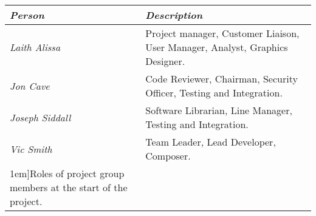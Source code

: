 \begin{table*}[h!]
	\begin{tabular}{l p{38em}}
		\toprule
		\emph{Person} & \emph{Description} \\
		\midrule
		\emph{Laith Alissa} & Project manager, Customer Liaison, User Manager, Analyst, Graphics Designer.\\[0.5em]
		\emph{Jon Cave} & Code Reviewer, Chairman, Security Officer, Testing and Integration.\\[0.5em]
		\emph{Joseph Siddall} & Software Librarian, Line Manager, Testing and Integration.\\[0.5em]
		\emph{Vic Smith} & Team Leader, Lead Developer, Composer.\\[0.5em]
		\bottomrule
		\caption[][1em]{Roles of project group members at the start of the project.}
	\end{tabular}
	\label{tab:roles}
\end{table*}